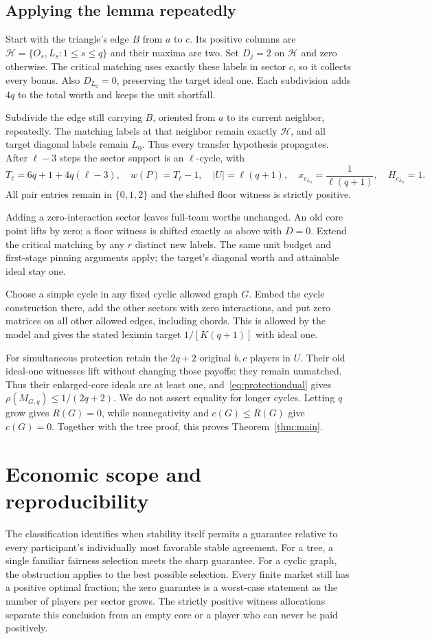 \documentclass[11pt]{article}
\theoremstyle{remark}\newtheorem{remark}[theorem]{Remark}
\begin{document}
\subsection{Applying the lemma repeatedly}
Start with the triangle's edge $B$ from $a$ to $c$. Its positive columns
are $\mathcal H=\{O_s,L_s:1\le s\le q\}$ and their maxima are two.
Set $D_j=2$ on $\mathcal H$ and zero otherwise. The critical matching
uses exactly these labels in sector $c$, so it collects every bonus.
Also $D_{L_0}=0$, preserving the target ideal one. Each subdivision adds
$4q$ to the total worth and keeps the unit shortfall.

Subdivide the edge still carrying $B$, oriented from $a$ to its current
neighbor, repeatedly. The matching labels at that neighbor remain exactly
$\mathcal H$, and all target diagonal labels remain $L_0$. Thus every
transfer hypothesis propagates. After $\ell-3$ steps the sector support is
an $\ell$-cycle, with
\[
 T_\ell=6q+1+4q(\ell-3),\quad w(P)=T_\ell-1,\quad
 |U|=\ell(q+1),\quad x_{c_{L_0}}=\frac1{\ell(q+1)},\quad H_{c_{L_0}}=1.
\]
All pair entries remain in $\{0,1,2\}$ and the shifted floor witness is
strictly positive.

Adding a zero-interaction sector leaves full-team worths unchanged.
An old core point lifts by zero; a floor witness is shifted exactly as
above with $D=0$. Extend the critical matching by any $r$ distinct new
labels. The same unit budget and first-stage pinning arguments apply;
the target's diagonal worth and attainable ideal stay one.

Choose a simple cycle in any fixed cyclic allowed graph $G$. Embed the
cycle construction there, add the other sectors with zero interactions,
and put zero matrices on all other allowed edges, including chords.
This is allowed by the model and gives the stated leximin target
$1/[K(q+1)]$ with ideal one.

For simultaneous protection retain the $2q+2$ original $b,c$ players in
$U$. Their old ideal-one witnesses lift without changing those payoffs;
they remain unmatched. Thus their enlarged-core ideals are at least one,
and~\eqref{eq:protectiondual} gives
$\rho(M_{G,q})\le1/(2q+2)$. We do not assert equality for longer cycles.
Letting $q$ grow gives $R(G)=0$, while nonnegativity and $c(G)\le R(G)$
give $c(G)=0$. Together with the tree proof, this proves
Theorem~\ref{thm:main}.

\section{Economic scope and reproducibility}
The classification identifies when stability itself permits a guarantee
relative to every participant's individually most favorable stable agreement.
For a tree, a single familiar fairness selection meets the sharp guarantee.
For a cyclic graph, the obstruction applies to the best possible selection.
Every finite market still has a positive optimal fraction; the zero guarantee
is a worst-case statement as the number of players per sector grows. The
strictly positive witness allocations separate this conclusion from an empty
core or a player who can never be paid positively.
\end{document}
